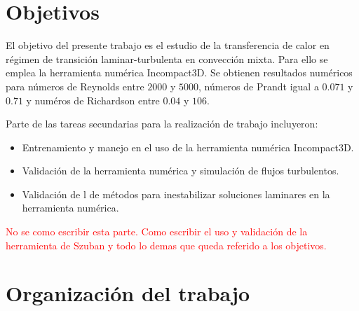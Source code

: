 \section{Objetivos}

El objetivo del presente trabajo es el estudio de la transferencia de calor en régimen de transición laminar-turbulenta en convección mixta. Para ello se emplea la herramienta numérica Incompact3D. Se obtienen resultados numéricos para números de Reynolds entre $2000$ y $5000$, números de Prandt igual a $0.071$ y $0.71$ y numéros de Richardson entre $0.04$ y $106$.

Parte de las tareas secundarias para la realización de trabajo incluyeron:

\begin{itemize}

	\item Entrenamiento y manejo en el uso de la herramienta numérica Incompact3D.
	
	\item Validación de la herramienta numérica y simulación de flujos turbulentos.

	\item Validación de l de métodos para inestabilizar soluciones laminares en la herramienta
numérica.

\end{itemize}

\textcolor{red}{No se como escribir esta parte. Como escribir el uso y validación de la herramienta de Szuban y todo lo demas que queda referido a los objetivos.}





\section{Organización del trabajo}